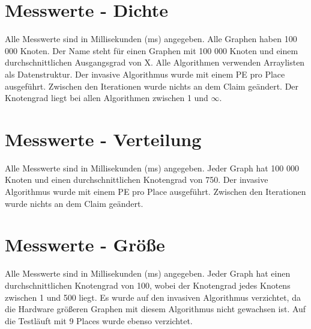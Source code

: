 

\appendix
{}

\section{Messwerte - Dichte}
\label{Anhang-Messwerte-Dichte}
Alle Messwerte sind in Millisekunden (ms) angegeben. Alle Graphen haben 100 000 Knoten. Der Name  steht für einen Graphen mit 100 000 Knoten und einem durchschnittlichen Ausgangsgrad von X. Alle Algorithmen verwenden Arraylisten als Datenstruktur. Der invasive Algorithmus wurde mit einem PE pro Place ausgeführt. Zwischen den Iterationen wurde nichts an dem Claim geändert. Der Knotengrad liegt bei allen Algorithmen zwischen 1 und $\infty$.
 

\clearpage
\section{Messwerte - Verteilung}
\label{Anhang-Messwerte-Verteilung}
Alle Messwerte sind in Millisekunden (ms) angegeben. Jeder Graph hat 100 000 Knoten und einen durchschnittlichen Knotengrad von 750. Der invasive Algorithmus wurde mit einem PE pro Place ausgeführt. Zwischen den Iterationen wurde nichts an dem Claim geändert.


\clearpage
\section{Messwerte - Größe}
\label{Anhang-Messwerte-Groesse}
Alle Messwerte sind in Millisekunden (ms) angegeben. Jeder Graph hat einen durchschnittlichen Knotengrad von 100, wobei der Knotengrad jedes Knotens zwischen 1 und 500 liegt. Es wurde auf den invasiven Algorithmus verzichtet, da die Hardware größeren Graphen mit diesem Algorithmus nicht gewachsen ist. Auf die Testläuft mit 9 Places wurde ebenso verzichtet.


		
